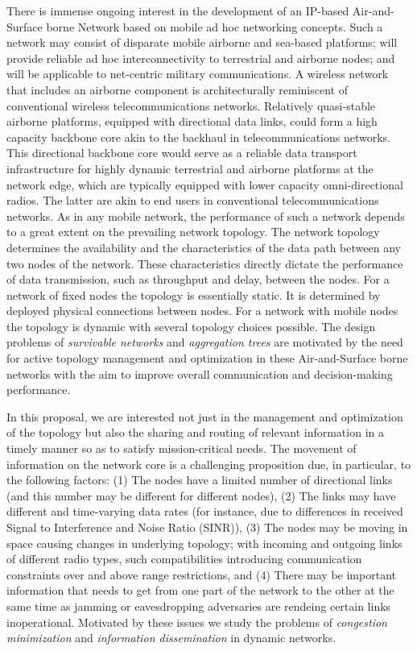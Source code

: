 There is immense ongoing interest in the development of an 
IP-based Air-and-Surface borne Network based on mobile ad hoc 
networking concepts. Such a network may consist of 
disparate mobile airborne and sea-based platforms; will provide reliable ad 
hoc interconnectivity to terrestrial and airborne nodes; and 
will be applicable to net-centric military communications. A 
wireless network that includes an airborne component is 
architecturally reminiscent of conventional wireless 
telecommunications networks. Relatively quasi-stable 
airborne platforms, equipped with directional data links, could 
form a high capacity backbone core akin to the backhaul in 
telecommunications networks. This directional backbone core 
would serve as a reliable data transport infrastructure for 
highly dynamic terrestrial and airborne platforms at the 
network edge, which are typically equipped with lower 
capacity omni-directional radios. The latter are akin to end 
users in conventional telecommunications networks.  
As in any mobile network, the performance of such a network 
depends to a great extent on the prevailing network topology. 
The network topology determines the availability and the 
characteristics of the data path between any two nodes of the 
network. These characteristics directly dictate the performance 
of data transmission, such as throughput and delay, between 
the nodes. For a network of fixed nodes the topology is 
essentially static. It is determined by deployed physical 
connections between nodes. For a network with mobile nodes 
the topology is dynamic with several topology choices 
possible. The design problems of {\em survivable networks} 
and {\em aggregation trees}  are motivated by the
need for active topology management and optimization in 
these Air-and-Surface borne networks with 
the aim to improve overall communication and decision-making performance. 

In this proposal, we are interested not just in the management and 
optimization of the topology but also the sharing and routing of 
relevant information in a timely manner so as to satisfy mission-critical 
needs. The movement of information on the network core is a challenging 
proposition due, in particular, to the following factors: (1) The 
nodes have a limited number of  directional links (and this 
number may be different for different nodes), (2) The links 
may have different and time-varying data rates (for instance, due to differences 
in received Signal to Interference and Noise Ratio (SINR)), 
(3) The nodes may be moving in space causing changes in underlying topology;
with incoming and outgoing links of different radio 
types, such compatibilities introducing communication constraints over and above
range restrictions, and (4) There may be important information that needs
to get from one part of the network to the other at the same time as 
jamming or eavesdropping adversaries are rendeing certain links inoperational.
Motivated by these issues we study the problems of {\em congestion
minimization} and {\em information dissemination} in dynamic networks.

